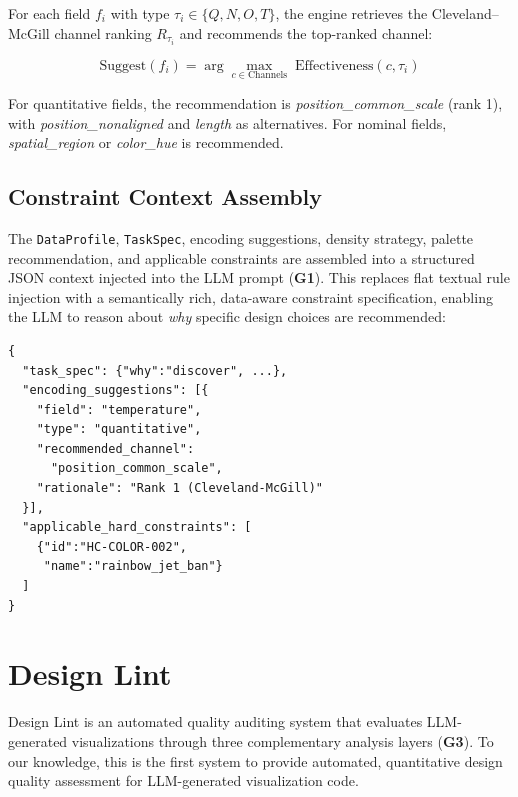 \documentclass[final,5p,times,twocolumn]{elsarticle}
\begin{document}
For each field $f_i$ with type $\tau_i \in \{Q, N, O, T\}$, the engine retrieves the Cleveland--McGill channel ranking $R_{\tau_i}$ and recommends the top-ranked channel:

\begin{equation}
\text{Suggest}(f_i) = \arg\max_{c \in \text{Channels}} \; \text{Effectiveness}(c, \tau_i)
\end{equation}

For quantitative fields, the recommendation is \textit{position\_common\_scale} (rank 1), with \textit{position\_nonaligned} and \textit{length} as alternatives.
For nominal fields, \textit{spatial\_region} or \textit{color\_hue} is recommended.

\subsection{Constraint Context Assembly}

The \texttt{DataProfile}, \texttt{TaskSpec}, encoding suggestions, density strategy, palette recommendation, and applicable constraints are assembled into a structured JSON context injected into the LLM prompt (\textbf{G1}).
This replaces flat textual rule injection with a semantically rich, data-aware constraint specification, enabling the LLM to reason about \textit{why} specific design choices are recommended:

\begin{verbatim}
{
  "task_spec": {"why":"discover", ...},
  "encoding_suggestions": [{
    "field": "temperature",
    "type": "quantitative",
    "recommended_channel":
      "position_common_scale",
    "rationale": "Rank 1 (Cleveland-McGill)"
  }],
  "applicable_hard_constraints": [
    {"id":"HC-COLOR-002",
     "name":"rainbow_jet_ban"}
  ]
}
\end{verbatim}


\section{Design Lint}
\label{sec:lint}

Design Lint is an automated quality auditing system that evaluates LLM-generated visualizations through three complementary analysis layers (\textbf{G3}).
To our knowledge, this is the first system to provide automated, quantitative design quality assessment for LLM-generated visualization code.
\end{document}
